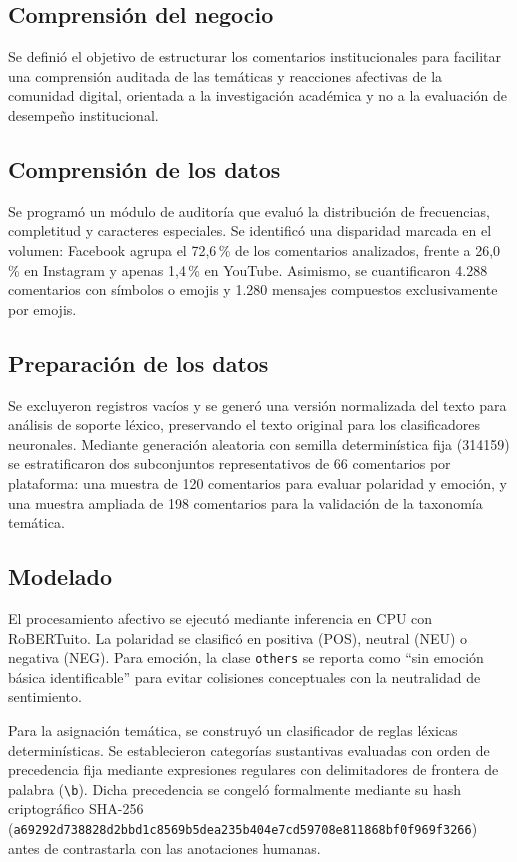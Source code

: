 \documentclass[conference]{IEEEtran}
\newcommand{\pc}{\,\%}
\begin{document}
\subsection{Comprensi\'on del negocio}
Se defini\'o el objetivo de estructurar los comentarios institucionales para facilitar una comprensi\'on auditada de las tem\'aticas y reacciones afectivas de la comunidad digital, orientada a la investigaci\'on acad\'emica y no a la evaluaci\'on de desempe\~no institucional.

\subsection{Comprensi\'on de los datos}
Se program\'o un m\'odulo de auditor\'ia que evalu\'o la distribuci\'on de frecuencias, completitud y caracteres especiales. Se identific\'o una disparidad marcada en el volumen: Facebook agrupa el 72,6\pc{} de los comentarios analizados, frente a 26,0\pc{} en Instagram y apenas 1,4\pc{} en YouTube. Asimismo, se cuantificaron 4.288 comentarios con s\'imbolos o emojis y 1.280 mensajes compuestos exclusivamente por emojis.

\subsection{Preparaci\'on de los datos}
Se excluyeron registros vac\'ios y se gener\'o una versi\'on normalizada del texto para an\'alisis de soporte l\'exico, preservando el texto original para los clasificadores neuronales. Mediante generaci\'on aleatoria con semilla determin\'istica fija (314159) se estratificaron dos subconjuntos representativos de 66 comentarios por plataforma: una muestra de 120 comentarios para evaluar polaridad y emoci\'on, y una muestra ampliada de 198 comentarios para la validaci\'on de la taxonom\'ia tem\'atica.

\subsection{Modelado}
El procesamiento afectivo se ejecut\'o mediante inferencia en CPU con RoBERTuito. La polaridad se clasific\'o en positiva (POS), neutral (NEU) o negativa (NEG). Para emoci\'on, la clase \texttt{others} se reporta como ``sin emoci\'on b\'asica identificable'' para evitar colisiones conceptuales con la neutralidad de sentimiento.

Para la asignaci\'on tem\'atica, se construy\'o un clasificador de reglas l\'exicas determin\'isticas. Se establecieron categor\'ias sustantivas evaluadas con orden de precedencia fija mediante expresiones regulares con delimitadores de frontera de palabra (\texttt{\textbackslash b}). Dicha precedencia se congel\'o formalmente mediante su hash criptogr\'afico SHA-256 (\texttt{a69292d7\allowbreak{}38828d2b\allowbreak{}bd1c8569\allowbreak{}b5dea235\allowbreak{}b404e7cd\allowbreak{}59708e81\allowbreak{}1868bf0f\allowbreak{}969f3266}) antes de contrastarla con las anotaciones humanas.
\end{document}
